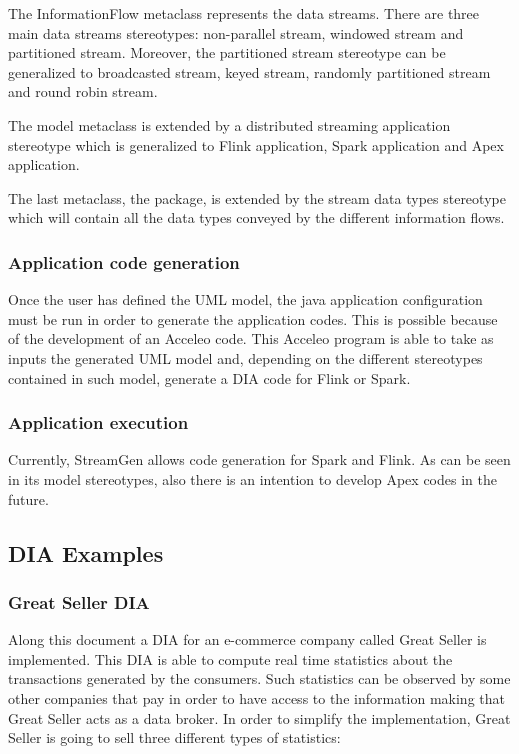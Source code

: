 The InformationFlow metaclass represents the data streams. There are three main data streams stereotypes: non-parallel stream, windowed stream and partitioned stream. Moreover, the partitioned stream stereotype can be generalized to broadcasted stream, keyed stream, randomly partitioned stream and round robin stream.

The model metaclass is extended by a distributed streaming application stereotype which is generalized to Flink application, Spark application and Apex application.

The last metaclass, the package, is extended by the stream data types stereotype which will contain all the data types conveyed by the different information flows.

\subsubsection*{Application code generation}

Once the user has defined the UML model, the java application configuration must be run in order to generate the application codes. This is possible because of the development of an Acceleo code. This Acceleo program is able to take as inputs the generated UML model and, depending on the different stereotypes contained in such model, generate a DIA code for Flink or Spark.

\subsubsection*{Application execution}

Currently, StreamGen allows code generation for Spark and Flink. As can be seen in its model stereotypes, also there is an intention to develop Apex codes in the future.

\subsection{DIA Examples}

\subsubsection{Great Seller DIA}
Along this document a DIA for an e-commerce company called Great Seller is implemented. This DIA is able to compute real time statistics about the transactions generated by the consumers. Such statistics can be observed by some other companies that pay in order to have access to the information making that Great Seller acts as a data broker. In order to simplify the implementation, Great Seller is going to sell three different types of statistics:

